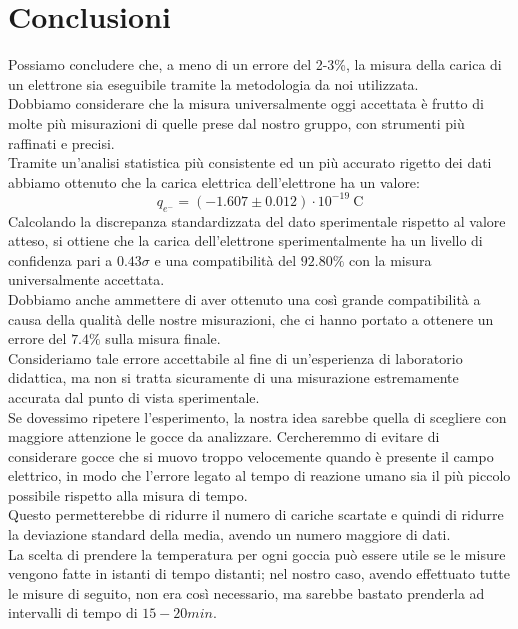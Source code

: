 \section{Conclusioni}
        Possiamo concludere che, a meno di un errore del 2-3\%, la misura della carica di un elettrone sia eseguibile tramite la metodologia da noi utilizzata.\\
        Dobbiamo considerare che la misura universalmente oggi accettata è frutto di molte più misurazioni di quelle prese dal nostro gruppo, con strumenti più raffinati e precisi.\\
        Tramite un'analisi statistica più consistente ed un più accurato rigetto dei dati abbiamo ottenuto che la carica elettrica dell'elettrone ha un valore:
        $$q_{e^-} = \left(-1.607\pm0.012\right)\cdot10^{-19}~\mathrm{C}$$
        Calcolando la discrepanza standardizzata del dato sperimentale rispetto al valore atteso, si ottiene che la carica dell'elettrone sperimentalmente ha un livello di confidenza pari a $0.43\sigma$ e una compatibilità del $92.80\%$ con la misura universalmente accettata.\\
        Dobbiamo anche ammettere di aver ottenuto una così grande compatibilità a causa della qualità delle nostre misurazioni, che ci hanno portato a ottenere un errore del $7.4\%$ sulla misura finale.\\
        Consideriamo tale errore accettabile al fine di un'esperienza di laboratorio didattica, ma non si tratta sicuramente di una misurazione estremamente accurata dal punto di vista sperimentale.\\
        Se dovessimo ripetere l'esperimento, la nostra idea sarebbe quella di scegliere con maggiore attenzione le gocce da analizzare. Cercheremmo di evitare di considerare gocce che si muovo troppo velocemente quando è presente il campo elettrico, in modo che l'errore legato al tempo di reazione umano sia il più piccolo possibile rispetto alla misura di tempo.\\
        Questo permetterebbe di ridurre il numero di cariche scartate e quindi di ridurre la deviazione standard della media, avendo un numero maggiore di dati.\\
        La scelta di prendere la temperatura per ogni goccia può essere utile se le misure vengono fatte in istanti di tempo distanti; nel nostro caso, avendo effettuato tutte le misure di seguito, non era così necessario, ma sarebbe bastato prenderla ad intervalli di tempo di $15-20min$.\\
        